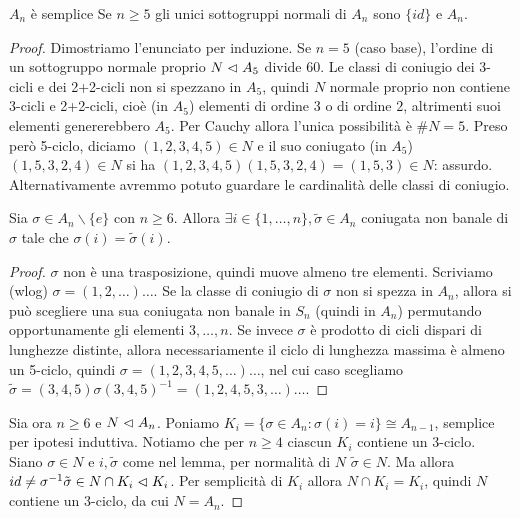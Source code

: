 \begin{proposition}{$A_n$ è semplice}
    Se $n \ge 5$ gli unici sottogruppi normali di $A_n$ sono $\{id\}$ e $A_n$.
\end{proposition}
\begin{proof}
    Dimostriamo l'enunciato per induzione. Se $n = 5$ (caso base), l'ordine di un sottogruppo normale proprio $N \vartriangleleft A_5$ divide $60$. Le classi di coniugio dei 3-cicli e dei 2+2-cicli non si spezzano in $A_5$, quindi $N$ normale proprio non contiene 3-cicli e 2+2-cicli, cioè (in $A_5$) elementi di ordine $3$ o di ordine $2$, altrimenti suoi elementi genererebbero $A_5$. Per Cauchy allora l'unica possibilità è $\#N = 5$. Preso però 5-ciclo, diciamo $(1, 2, 3, 4, 5) \in N$ e il suo coniugato (in $A_5$) $(1, 5, 3, 2, 4) \in N$ si ha $(1, 2, 3, 4, 5)(1, 5, 3, 2, 4) = (1, 5, 3) \in N$: assurdo. Alternativamente avremmo potuto guardare le cardinalità delle classi di coniugio.

    \begin{lemma2}
        Sia $\sigma \in A_n\backslash\{e\}$ con $n \ge 6$. Allora $\exists i \in \{1, \dots, n\}, \tilde \sigma \in A_n$ coniugata non banale di $\sigma$ tale che $\sigma(i) = \tilde \sigma(i)$.
    \end{lemma2}
    \begin{proof}
        $\sigma$ non è una trasposizione, quindi muove almeno tre elementi. Scriviamo (wlog) $\sigma = (1, 2, \dots)\dots$. Se la classe di coniugio di $\sigma$ non si spezza in $A_n$, allora si può scegliere una sua coniugata non banale in $S_n$ (quindi in $A_n$) permutando opportunamente gli elementi $3, \dots, n$. Se invece $\sigma$ è prodotto di cicli dispari di lunghezze distinte, allora necessariamente il ciclo di lunghezza massima è almeno un 5-ciclo, quindi $\sigma = (1, 2, 3, 4, 5, \dots)\dots$, nel cui caso scegliamo $\tilde \sigma = (3, 4, 5) \sigma (3, 4, 5)^{-1} = (1, 2, 4, 5, 3, \dots)\dots$.
    \end{proof}
    Sia ora $n \ge 6$ e $N \vartriangleleft A_n$. Poniamo $K_i = \{\sigma \in A_n : \sigma(i) = i\} \cong A_{n - 1}$, semplice per ipotesi induttiva. Notiamo che per $n \ge 4$ ciascun $K_i$ contiene un 3-ciclo. Siano $\sigma \in N$ e $i, \tilde \sigma$ come nel lemma, per normalità di $N$ $\tilde \sigma \in N$. Ma allora $id \neq \sigma^{-1} {\tilde \sigma} \in N \cap K_i \vartriangleleft K_i$. Per semplicità di $K_i$ allora $N \cap K_i = K_i$, quindi $N$ contiene un 3-ciclo, da cui $N = A_n$.
\end{proof}
    
